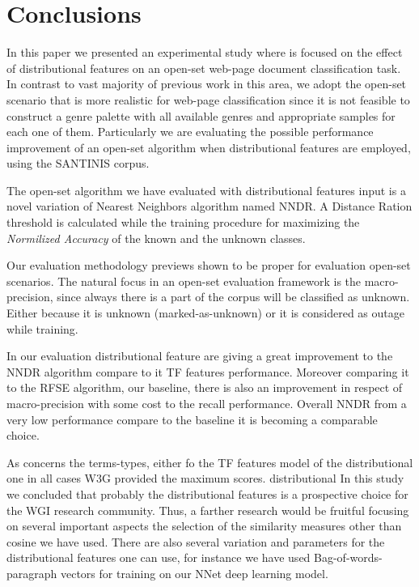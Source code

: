 \section{Conclusions}\label{sec:conclusions}

In this paper we presented an experimental study where is focused on the effect of distributional features on an open-set web-page document classification task. In contrast to vast majority of previous work in this area, we adopt the open-set scenario that is more realistic for  web-page classification since it is not feasible to construct a genre palette with all available genres and appropriate samples for each one of them. Particularly we are evaluating the possible performance improvement of an open-set algorithm when distributional features are employed, using the SANTINIS corpus.

The open-set algorithm we have evaluated with distributional features input is a novel variation of Nearest Neighbors algorithm named NNDR. A Distance Ration threshold is calculated while the training procedure for maximizing the \textit{Normilized Accuracy} of the known and the unknown classes.

Our evaluation methodology previews shown to be proper for evaluation open-set scenarios. The natural focus in an open-set evaluation framework is the macro-precision, since always there is a part of the corpus will be classified as unknown. Either because it is unknown (marked-as-unknown) or it is considered as outage while training.

In our evaluation distributional feature are giving a great improvement to the NNDR algorithm compare to it TF features performance. Moreover comparing it to the RFSE algorithm, our baseline, there is also an improvement in respect of macro-precision with some cost to the recall performance. Overall NNDR from a very low performance compare to the baseline it is becoming a comparable choice.

As concerns the terms-types, either fo the TF features model of the distributional one in all cases W3G provided the maximum scores.
distributional
In this study we concluded that probably the distributional features is a prospective choice for the WGI research community. Thus, a farther research would be fruitful focusing on several important aspects the selection of the similarity measures other than cosine we have used. There are also several variation and parameters for the distributional features one can use, for instance we have used Bag-of-words-paragraph vectors for training on our NNet deep learning model.

